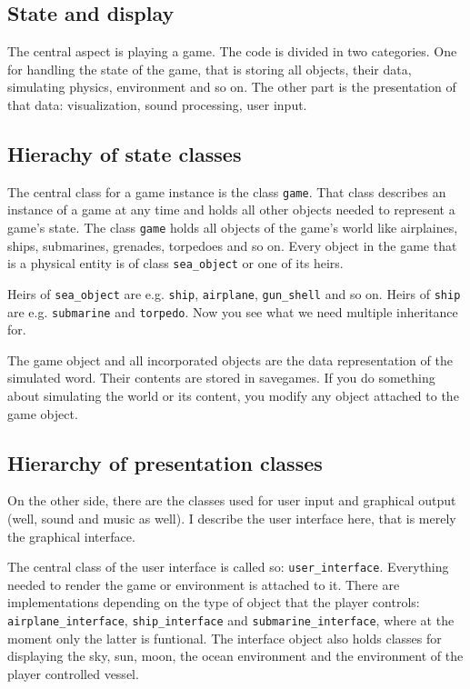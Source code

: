 \documentclass[english,a4paper,12pt]{report}
\begin{document}
\subsection{State and display}

The central aspect is playing a game. The code is divided in two
categories. One for handling the state of the game, that is storing all
objects, their data, simulating physics, environment and so on. The
other part is the presentation of that data: visualization, sound
processing, user input.

\subsection{Hierachy of state classes}

The central class for a game instance is the class \texttt{game}. That
class describes an instance of a game at any time and holds all other
objects needed to represent a game's state. The class \texttt{game}
holds all objects of the game's world like airplaines, ships,
submarines, grenades, torpedoes and so on. Every object in the game that
is a physical entity is of class \texttt{sea\_object} or one of its
heirs.

Heirs of \texttt{sea\_object} are e.g. \texttt{ship}, \texttt{airplane},
\texttt{gun\_shell} and so on. Heirs of \texttt{ship} are e.g.
\texttt{submarine} and \texttt{torpedo}. Now you see what we need
multiple inheritance for.

The game object and all incorporated objects are the data representation
of the simulated word. Their contents are stored in savegames. If you do
something about simulating the world or its content, you modify any
object attached to the game object.

\subsection{Hierarchy of presentation classes}

On the other side, there are the classes used for user input and
graphical output (well, sound and music as well). I describe the user
interface here, that is merely the graphical interface.

The central class of the user interface is called so:
\texttt{user\_interface}. Everything needed to render the game or
environment is attached to it. There are implementations depending on
the type of object that the player controls:
\texttt{airplane\_interface}, \texttt{ship\_interface} and
\texttt{submarine\_interface}, where at the moment only the latter is
funtional. The interface object also holds classes for displaying the
sky, sun, moon, the ocean environment and the environment of the player
controlled vessel.
\end{document}
